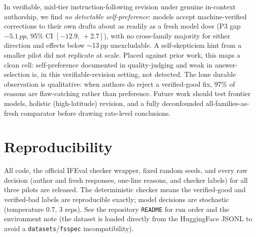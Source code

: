 \documentclass[11pt]{article}
\newcommand{\pp}{\,pp}
\newcommand{\CI}[2]{$[#1,\,#2]$}
\begin{document}
In verifiable, mid-tier instruction-following revision under genuine in-context authorship, we find
\emph{no detectable self-preference}: models accept machine-verified corrections to their own drafts
about as readily as a fresh model does (P3 gap $-5.1\pp$, 95\% CI \CI{-12.9}{+2.7}), with no
cross-family majority for either direction and effects below $\sim$13\pp{} unexcludable. A
self-skepticism hint from a smaller pilot did not replicate at scale. Placed against prior work, this
maps a clean cell: self-preference documented in quality-judging and weak in answer-selection is, in
this verifiable-revision setting, not detected. The lone durable observation is qualitative: when
authors do reject a verified-good fix, $97\%$ of reasons are flaw-catching rather than preference.
Future work should test frontier models, holistic (high-latitude) revision, and a fully deconfounded
all-families-as-fresh comparator before drawing rate-level conclusions.

\section*{Reproducibility}
All code, the official IFEval checker wrapper, fixed random seeds, and every raw decision (author and
fresh responses, one-line reasons, and checker labels) for all three pilots are released. The
deterministic checker means the verified-good and verified-bad labels are reproducible exactly;
model decisions are stochastic (temperature $0.7$, $3$ reps). See the repository \texttt{README}
for run order and the environment note (the dataset is loaded directly from the HuggingFace JSONL
to avoid a \texttt{datasets}/\texttt{fsspec} incompatibility).



\end{document}
